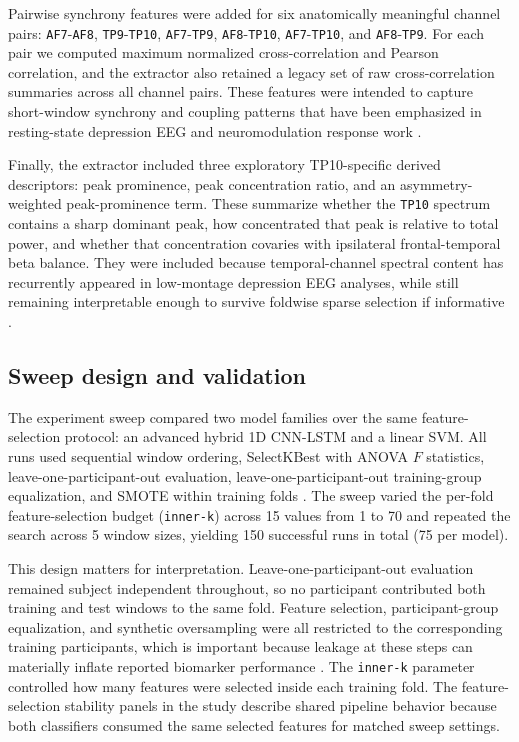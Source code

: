 Pairwise synchrony features were added for six anatomically meaningful channel pairs: \texttt{AF7}-\texttt{AF8}, \texttt{TP9}-\texttt{TP10}, \texttt{AF7}-\texttt{TP9}, \texttt{AF8}-\texttt{TP10}, \texttt{AF7}-\texttt{TP10}, and \texttt{AF8}-\texttt{TP9}. For each pair we computed maximum normalized cross-correlation and Pearson correlation, and the extractor also retained a legacy set of raw cross-correlation summaries across all channel pairs. These features were intended to capture short-window synchrony and coupling patterns that have been emphasized in resting-state depression EEG and neuromodulation response work \citep{Ghiasi2021,Zhao2022,ulrich2025_alterations}.

Finally, the extractor included three exploratory TP10-specific derived descriptors: peak prominence, peak concentration ratio, and an asymmetry-weighted peak-prominence term. These summarize whether the \texttt{TP10} spectrum contains a sharp dominant peak, how concentrated that peak is relative to total power, and whether that concentration covaries with ipsilateral frontal-temporal beta balance. They were included because temporal-channel spectral content has recurrently appeared in low-montage depression EEG analyses, while still remaining interpretable enough to survive foldwise sparse selection if informative \citep{Mahato2020,Mumtaz2017}.

\subsection{Sweep design and validation}

The experiment sweep compared two model families over the same feature-selection protocol: an advanced hybrid 1D CNN-LSTM and a linear SVM. All runs used sequential window ordering, SelectKBest with ANOVA $F$ statistics, leave-one-participant-out evaluation, leave-one-participant-out training-group equalization, and SMOTE within training folds \citep{Chawla2002}. The sweep varied the per-fold feature-selection budget (\texttt{inner-k}) across 15 values from 1 to 70 and repeated the search across 5 window sizes, yielding 150 successful runs in total (75 per model).

This design matters for interpretation. Leave-one-participant-out evaluation remained subject independent throughout, so no participant contributed both training and test windows to the same fold. Feature selection, participant-group equalization, and synthetic oversampling were all restricted to the corresponding training participants, which is important because leakage at these steps can materially inflate reported biomarker performance \citep{Shim2021}. The \texttt{inner-k} parameter controlled how many features were selected inside each training fold. The feature-selection stability panels in the study describe shared pipeline behavior because both classifiers consumed the same selected features for matched sweep settings.

